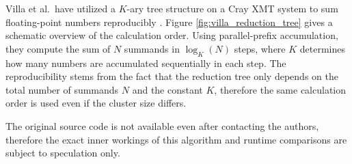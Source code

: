 Villa et al.\ have utilized a $K$-ary tree structure on a Cray XMT system to sum floating-point numbers reproducibly \cite{villa_effects_2009}.
Figure \ref{fig:villa_reduction_tree} gives a schematic overview of the calculation order.
Using parallel-prefix accumulation, they compute the sum of $N$ summands in $\log_K (N)$ steps, where $K$ determines how many numbers are accumulated sequentially in each step.
The reproducibility stems from the fact that the reduction tree only depends on the total number of summands $N$ and the constant $K$, therefore the same calculation order is used even if the cluster size differs.

The original source code is not available even after contacting the authors, therefore the exact inner workings of this algorithm and runtime comparisons are subject to speculation only.
